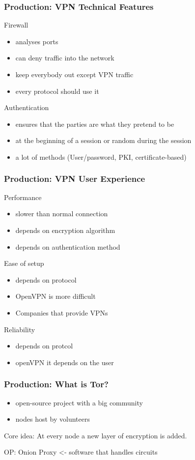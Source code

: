 \documentclass[9pt]{beamer}
\begin{document}
\begin{frame}
\frametitle{Production: VPN Technical Features}
Firewall
	\begin{itemize}
	\item analyses ports
	\item can deny traffic into the network
	\item keep everybody out except VPN traffic
	\item every protocol should use it
	\end{itemize}
Authentication
	\begin{itemize}
	\item ensures that the parties are what they pretend to be
	\item at the beginning of a session or random during the session
	\item a lot of methods (User/password, PKI, certificate-based)
	\end{itemize}
\end{frame}

\begin{frame}
\frametitle{Production: VPN User Experience}
Performance
\begin{itemize}
\item slower than normal connection
\item depends on encryption algorithm
\item depends on authentication method
\end{itemize}
Ease of setup
\begin{itemize}
 \item depends on protocol
 \item OpenVPN is more difficult
 \item Companies that provide VPNs
\end{itemize}
Reliability
\begin{itemize}
\item depends on protcol
\item openVPN it depends on the user
\end{itemize}
\end{frame}

\begin{frame}
\frametitle{Production: What is Tor?}
	\begin{itemize}
	\item open-source project with a big community
	\item nodes host by volunteers
	\end{itemize}
	Core idea: At every node a new layer of encryption is added.

	OP: Onion Proxy <- software that handles circuits
\end{frame}
\end{document}
